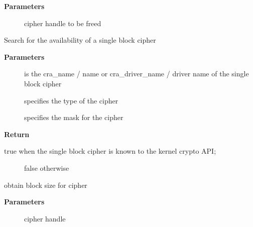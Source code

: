 \documentclass[a4paper,8pt,english]{sphinxmanual}
\begin{document}
\textbf{Parameters}
\begin{description}
\item[{}] \leavevmode
cipher handle to be freed

\end{description}

\begin{fulllineitems}
\label{crypto/api-skcipher:c.crypto_has_cipher}
Search for the availability of a single block cipher

\end{fulllineitems}


\textbf{Parameters}
\begin{description}
\item[{}] \leavevmode
is the cra\_name / name or cra\_driver\_name / driver name of the
single block cipher

\item[{}] \leavevmode
specifies the type of the cipher

\item[{}] \leavevmode
specifies the mask for the cipher

\end{description}

\textbf{Return}
\begin{description}
\item[{true when the single block cipher is known to the kernel crypto API;}] \leavevmode
false otherwise

\end{description}

\begin{fulllineitems}
\label{crypto/api-skcipher:c.crypto_cipher_blocksize}
obtain block size for cipher

\end{fulllineitems}


\textbf{Parameters}
\begin{description}
\item[{}] \leavevmode
cipher handle

\end{description}
\end{document}
